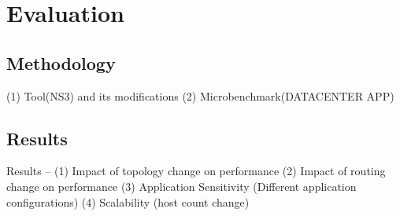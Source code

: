 \section{Evaluation}
\label{sec:eval}

\subsection {Methodology}
(1) Tool(NS3) and its modifications
(2) Microbenchmark(DATACENTER APP) 
\subsection {Results}
Results -- 
(1) Impact of topology change on performance
(2) Impact of routing change on performance
(3) Application Sensitivity (Different application configurations)
(4) Scalability (host count change)